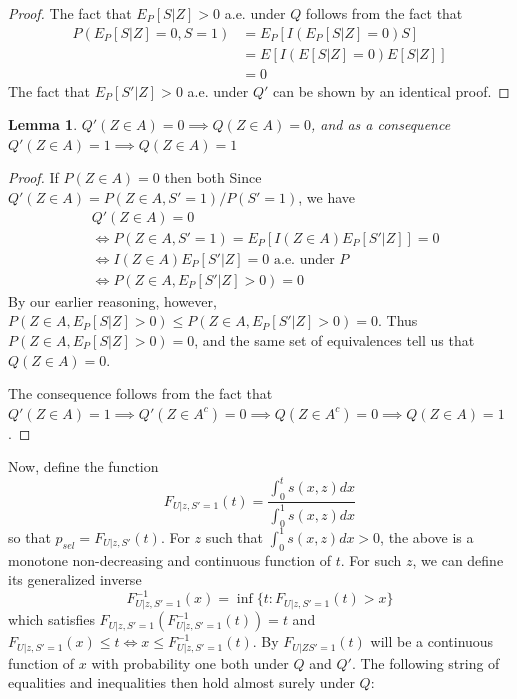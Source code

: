 \documentclass{article}
\newtheorem{lemma}{Lemma}
\begin{document}
\begin{appendix}
\begin{proof}
    The fact that $E_P[S|Z]> 0$ a.e. under $Q$ follows from the fact that 
    \begin{align*}
        P(E_P[S| Z] = 0, S=1) &= E_P[ I(E_P[S| Z] = 0) S] \\
                            &= E[ I(E[S| Z] = 0) E[S |Z]] \\
                            &= 0
    \end{align*}
    The fact that $E_P[S'|Z] > 0$ a.e. under $Q'$ can be shown by an identical proof. 
    
\end{proof}


\begin{lemma}
    \label{lem:switch}
    $Q'(Z \in A) = 0 \implies Q(Z \in A) = 0$, and as a consequence  $Q'(Z \in A) = 1 \implies Q(Z \in A) = 1$
\end{lemma}

\begin{proof}
    If $P(Z \in A) = 0$ then both 
    Since $Q'(Z \in A) = P(Z \in A, S'=1)/P(S'=1)$, we have
    \begin{align*}
        &Q'(Z \in A) = 0 \\
        &\iff P(Z \in A, S'=1) = E_P[ I(Z \in A) E_P[ S' |Z]] = 0\\
        &\iff I(Z \in A) E_P[ S' |Z] = 0 \text{ a.e. under } P \\
        &\iff P(Z \in A, E_P[S'|Z]>0) = 0 
    \end{align*} 
    By our earlier reasoning, however,  $P(Z \in A, E_P[S|Z]>0) \leq P(Z \in A, E_P[S'|Z]>0) = 0$. Thus  $P(Z \in A, E_P[S|Z]>0) =0$, and the same set of equivalences tell us that $Q(Z \in A) = 0$. 

    The consequence follows from the fact that $Q'(Z \in A) = 1 \implies Q'(Z \in A^c) = 0 \implies Q(Z \in A^c) = 0 \implies Q(Z \in A) = 1$. 
\end{proof}


Now, define the function 
\begin{equation*}
    F_{U|z, S'=1}(t) = \frac{\int_0^t s(x, z) dx }{\int_0^1 s(x, z) dx}
\end{equation*}
so that $p_{sel} = F_{U| z, S'}(t)$. For $z$ such that $\int_0^1 s(x, z) dx > 0$, the above is a monotone non-decreasing and continuous function of $t$. For such $z$, we can define its generalized inverse
\begin{equation*}
    F^{-1}_{U |z, S'=1}(x)  = \inf \{t : F_{U |z, S' = 1}(t) > x  \}
\end{equation*}
which satisfies $F_{U|z, S' =1}(F^{-1}_{U |z, S'=1}(t)) = t$ and $F_{U | z, S' = 1}(x) \leq t \iff x \leq  F^{-1}_{U | z, S' = 1}(t)$. By  $F_{U|Z S'=1}(t)$ will be a continuous function of $x$ with probability one both under $Q$ and $Q'$. The following string of equalities and inequalities then hold almost surely under $Q$:


\end{appendix}
\end{document}
